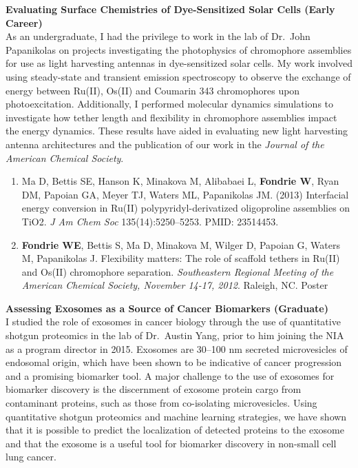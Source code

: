 \documentclass[11pt]{article}
\begin{document}
{\bf Evaluating Surface Chemistries of Dye-Sensitized Solar Cells (Early Career)} \\
As an undergraduate, I had the privilege to work in the lab of Dr.\ John Papanikolas on projects investigating the photophysics of chromophore assemblies for use as light harvesting antennas in dye-sensitized solar cells. My work involved using steady-state and transient emission spectroscopy to observe the exchange of energy between Ru(II), Os(II) and Coumarin 343 chromophores upon photoexcitation. Additionally, I performed molecular dynamics simulations to investigate how tether length and flexibility in chromophore assemblies impact the energy dynamics. These results have aided in evaluating new light harvesting antenna architectures and the publication of our work in the \textit{Journal of the American Chemical Society}.

\begin{enumerate}
  \item Ma D, Bettis SE, Hanson K, Minakova M, Alibabaei L, {\bf Fondrie W}, Ryan DM, Papoian GA, Meyer TJ, Waters ML, Papanikolas JM. (2013) Interfacial energy conversion in Ru(II) polypyridyl-derivatized oligoproline assemblies on TiO2. \textit{J Am Chem Soc} 135(14):5250--5253. PMID: 23514453.
  \item {\bf Fondrie WE}, Bettis S, Ma D, Minakova M, Wilger D, Papoian G, Waters M, Papanikolas J. Flexibility matters: The role of scaffold tethers in Ru(II) and Os(II) chromophore separation. {\it Southeastern Regional Meeting of the American Chemical Society, November 14-17, 2012}. Raleigh, NC. Poster
\end{enumerate}

{\bf Assessing Exosomes as a Source of Cancer Biomarkers (Graduate)} \\
I studied the role of exosomes in cancer biology through the use of quantitative shotgun proteomics in the lab of Dr.\ Austin Yang, prior to him joining the NIA as a program director in 2015. Exosomes are 30--100 nm secreted microvesicles of endosomal origin, which have been shown to be indicative of cancer progression and a promising biomarker tool. A major challenge to the use of exosomes for biomarker discovery is the discernment of exosome protein cargo from contaminant proteins, such as those from co-isolating microvesicles. Using quantitative shotgun proteomics and machine learning strategies, we have shown that it is possible to predict the localization of detected proteins to the exosome and that the exosome is a useful tool for biomarker discovery in non-small cell lung cancer.
\end{document}
